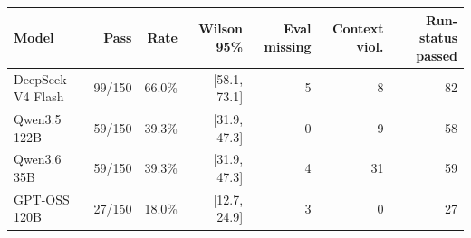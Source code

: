 \begin{tabular}{lrrrrrr}
\toprule
\textbf{Model} & \textbf{Pass} & \textbf{Rate} & \textbf{Wilson 95\%} & \textbf{Eval missing} & \textbf{Context viol.} & \textbf{Run-status passed} \\
\midrule
DeepSeek V4 Flash & 99/150 & 66.0\% & [58.1, 73.1] & 5 & 8 & 82 \\
Qwen3.5 122B & 59/150 & 39.3\% & [31.9, 47.3] & 0 & 9 & 58 \\
Qwen3.6 35B & 59/150 & 39.3\% & [31.9, 47.3] & 4 & 31 & 59 \\
GPT-OSS 120B & 27/150 & 18.0\% & [12.7, 24.9] & 3 & 0 & 27 \\
\bottomrule
\end{tabular}
